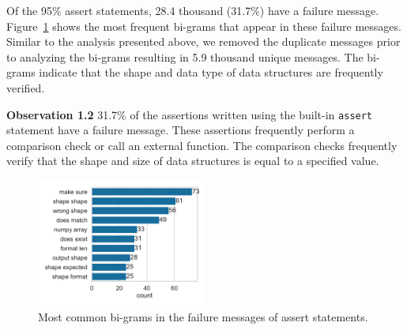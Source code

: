 \documentclass[smallextended]{svjour3}       %
\newcommand{\highlight}[1]{\begin{framed}%
  \noindent#1
\end{framed}}
\begin{document}
Of the 95\% assert statements, 28.4 thousand (31.7\%) have a failure message. Figure~\ref{fig:common-assert-msgs} shows the most frequent bi-grams that appear in these failure messages. Similar to the analysis presented above, we removed the duplicate messages prior to analyzing the bi-grams resulting in 5.9 thousand unique messages. The bi-grams indicate that the shape and data type of data structures are frequently verified.

\highlight{\textbf{Observation 1.2} 31.7\% of the assertions written using the built-in \lstinline{assert} statement have a failure message. These assertions frequently perform a comparison check or call an external function. The comparison checks frequently verify that the shape and size of data structures is equal to a specified value.}

\begin{figure}
	\centering
	\includegraphics[width=0.5\textwidth]{common-assert-msgs.pdf}
	\caption{Most common bi-grams in the failure messages of assert statements.}
	\label{fig:common-assert-msgs}
\end{figure}
\end{document}
